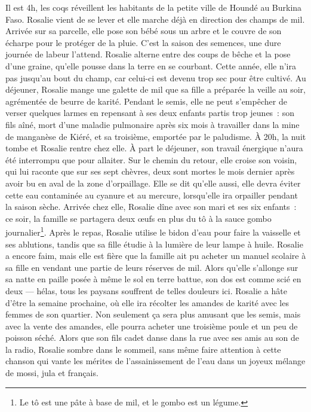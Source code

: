 \documentclass[a5paper,french,openany]{memoir}
\begin{document}
Il est 4h, les coqs réveillent les habitants de la petite ville de Houndé au Burkina Faso. Rosalie vient de se lever et elle marche déjà en direction des champs de mil. Arrivée sur sa parcelle, elle pose son bébé sous un arbre et le couvre de son écharpe pour le protéger de la pluie. C'est la saison des semences, une dure journée de labeur l'attend. Rosalie alterne entre des coups de bêche et la pose d'une graine, qu'elle pousse dans la terre en se courbant. Cette année, elle n'ira pas jusqu'au bout du champ, car celui-ci est devenu trop sec pour être cultivé. Au déjeuner, Rosalie mange une galette de mil que sa fille a préparée la veille au soir, agrémentée de beurre de karité. Pendant le semis, elle ne peut s'empêcher de verser quelques larmes en repensant à ses deux enfants partis trop jeunes~: son fils aîné, mort d'une maladie pulmonaire après six mois à travailler dans la mine de manganèse de Kiéré, et sa troisième, emportée par le paludisme. À 20h, la nuit tombe et Rosalie rentre chez elle. À part le déjeuner, son travail énergique n'aura été interrompu que pour allaiter. Sur le chemin du retour, elle croise son voisin, qui lui raconte que sur ses sept chèvres, deux sont mortes le mois dernier après avoir bu en aval de la zone d'orpaillage. Elle se dit qu'elle aussi, elle devra éviter cette eau contaminée au cyanure et au mercure, lorsqu'elle ira orpailler pendant la saison sèche. Arrivée chez elle, Rosalie dîne avec son mari et ses six enfants~: ce soir, la famille se partagera %
deux œufs en plus du tô à la sauce gombo journalier\footnote{Le tô est une pâte à base de mil, et le gombo est un légume.}. %
Après le repas, Rosalie utilise le bidon d'eau pour faire la vaisselle et ses ablutions, tandis que sa fille étudie à la lumière de leur lampe à huile. Rosalie a encore faim, mais elle est fière que la famille ait pu acheter un manuel scolaire à sa fille en vendant une partie de leurs réserves de mil. Alors qu'elle s'allonge sur sa natte en paille posée à même le sol en terre battue, son dos est comme scié en deux --- hélas, tous les paysans souffrent de telles douleurs ici. Rosalie a hâte d'être la semaine prochaine, où elle ira récolter les amandes de karité avec les femmes de son quartier. Non seulement ça sera plus amusant que les semis, mais avec la vente des amandes, elle pourra acheter une troisième poule et un peu de poisson séché. Alors que son fils cadet danse dans la rue avec ses amis au son de la radio, Rosalie sombre dans le sommeil, sans même faire attention à cette chanson qui vante les mérites de l'assainissement de l'eau dans un joyeux mélange de mossi, jula et français. 
\end{document}
